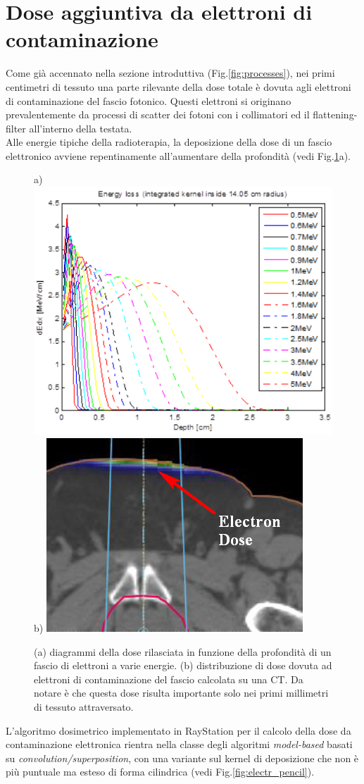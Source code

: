 {\section{Dose aggiuntiva da elettroni di contaminazione}
\label{sec:dose_electr}
Come già accennato nella sezione introduttiva (Fig.\ref{fig:processes}), nei primi centimetri di tessuto una parte rilevante della dose totale è dovuta agli elettroni di contaminazione del fascio fotonico. Questi elettroni si originano prevalentemente da processi di scatter dei fotoni con i collimatori ed il flattening-filter all'interno della testata.\\
Alle energie tipiche della radioterapia, la deposizione della dose di un fascio elettronico avviene repentinamente all'aumentare della profondità (vedi Fig.\ref{fig:electr_enloss}a).
\begin{figure}
\centering
a) \includegraphics[width=.45\textwidth]{./cap1/electr_enloss.png}
b) \includegraphics[width=.4\textwidth]{./cap1/electr_doseCT_zoom.png}
\caption{(a) diagrammi della dose rilasciata in funzione della profondità di un fascio di elettroni a varie energie. (b) distribuzione di dose dovuta ad elettroni di contaminazione del fascio calcolata su una CT. Da notare è che questa dose risulta importante solo nei primi millimetri di tessuto attraversato.}
\label{fig:electr_enloss}
\end{figure}

L'algoritmo dosimetrico implementato in RayStation per il calcolo della dose da contaminazione elettronica rientra nella classe degli algoritmi \textit{model-based} basati su \textit{convolution/superposition}, con una variante sul kernel di deposizione che non è più puntuale ma esteso di forma cilindrica (vedi Fig.\ref{fig:electr_pencil}). 

}
